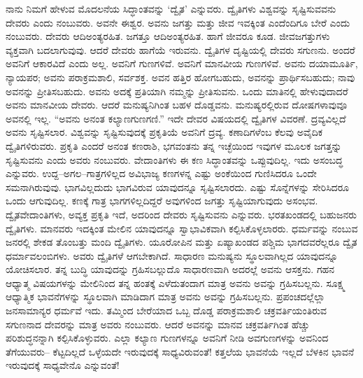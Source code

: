 ನಾನು ನಿಮಗೆ ಹೇಳುವ ಮೊದಲನೆಯ ಸಿದ್ಧಾಂತವನ್ನು ‘ದ್ವೈತ’ ಎನ್ನುವರು. ದ್ವೈತಿಗಳು ವಿಶ್ವವನ್ನು ಸೃಷ್ಟಿಸುವವನು ದೇವರು ಎಂದು ನಂಬುವರು. ಅವನೇ ಈಶ್ವರ. ಅವನು ಜಗತ್ತು ಮತ್ತು ಜೀವ ಇವಕ್ಕಿಂತ ಎಂದೆಂದಿಗೂ ಬೇರೆ ಎಂದು ನಂಬುವರು. ದೇವರು ಆದಿಅಂತ್ಯರಹಿತ. ಜಗತ್ತೂ ಆದಿಅಂತ್ಯರಹಿತ. ಹಾಗೆ ಜೀವರೂ ಕೂಡ. ಜೀವಜಗತ್ತುಗಳು ವ್ಯಕ್ತವಾಗಿ ಬದಲಾಗುವುವು. ಆದರೆ ದೇವರು ಹಾಗೆಯೆ ಇರುವನು. ದ್ವೈತಿಗಳ ದೃಷ್ಟಿಯಲ್ಲಿ ದೇವರು ಸಗುಣನು. ಅಂದರೆ ಅವನಿಗೆ ಆಕಾರವಿದೆ ಎಂದು ಅಲ್ಲ. ಅವನಿಗೆ ಗುಣಗಳಿವೆ. ಅವನಿಗೆ ಮಾನವೀಯ ಗುಣಗಳಿವೆ. ಅವನು ದಯಾಮೂರ್ತಿ, ನ್ಯಾಯಪರ; ಅವನು ಪರಾಕ್ರಮಶಾಲಿ, ಸರ್ವಶಕ್ತ. ಅವನ ಹತ್ತಿರ ಹೋಗಬಹುದು, ಅವನನ್ನು ಪ್ರಾರ್ಥಿಸಬಹುದು; ನಾವು ಅವನನ್ನು ಪ್ರೀತಿಸಬಹುದು. ಅವನು ಅದಕ್ಕೆ ಪ್ರತಿಯಾಗಿ ನಮ್ಮನ್ನು ಪ್ರೀತಿಸುವನು. ಒಂದು ಮಾತಿನಲ್ಲಿ ಹೇಳುವುದಾದರೆ ಅವನು ಮಾನವೀಯ ದೇವರು. ಆದರೆ ಮನುಷ್ಯನಿಗಿಂತ ಬಹಳ ದೊಡ್ಡವನು. ಮನುಷ್ಯರಲ್ಲಿರುವ ದೋಷಗಳಾವುವೂ ಅವನಲ್ಲಿ ಇಲ್ಲ. “ಅವನು ಅನಂತ ಕಲ್ಯಾಣಗುಣಗಣಿ.” ಇದೇ ದೇವರ ವಿಷಯದಲ್ಲಿ ದ್ವೈತಿಗಳ ವಿವರಣೆ. ದ್ರವ್ಯವಿಲ್ಲದೆ ಅವನು ಸೃಷ್ಟಿಸಲಾರ. ವಿಶ್ವವನ್ನು ಸೃಷ್ಟಿಸುವುದಕ್ಕೆ ಪ್ರಕೃತಿಯೆ ಅವನಿಗೆ ದ್ರವ್ಯ. ಕಣಾದಿಗಳೆಂಬ ಕೆಲವು ಅವೈದಿಕ ದ್ವೈತಿಗಳಿರುವರು. ಪ್ರಕೃತಿ ಎಂದರೆ ಅನಂತ ಕಣರಾಶಿ, ಭಗವಂತನು ತನ್ನ ಇಚ್ಛೆಯಿಂದ ಇವುಗಳ ಮೂಲಕ ಜಗತ್ತನ್ನು ಸೃಷ್ಟಿಸುವನು ಎಂದು ಅವರು ನಂಬುವರು. ವೇದಾಂತಿಗಳು ಈ ಕಣ ಸಿದ್ಧಾಂತವನ್ನು ಒಪ್ಪುವುದಿಲ್ಲ. ಇದು ಅಸಂಬದ್ಧ ಎನ್ನುವರು. ಉದ್ದ–ಅಗಲ–ಗಾತ್ರಗಳಿಲ್ಲದ ಅವಿಭಾಜ್ಯ ಕಣಗಳನ್ನ ಎಷ್ಟು ಅಂಕೆಯಿಂದ ಗುಣಿಸಿದರೂ ಒಂದೇ ಸಮನಾಗಿರುವುವು. ಭಾಗವಿಲ್ಲದುದು ಭಾಗವಿರುವ ಯಾವುದನ್ನೂ ಸೃಷ್ಟಿಸಲಾರದು. ಎಷ್ಟು ಸೊನ್ನೆಗಳನ್ನು ಸೇರಿಸಿದರೂ ಒಂದು ಆಗುವುದಿಲ್ಲ. ಕಣಕ್ಕೆ ಗಾತ್ರ ಭಾಗಗಳಿಲ್ಲದಿದ್ದರೆ ಅವುಗಳಿಂದ ಜಗತ್ತು ಸೃಷ್ಟಿಯಾಗುವುದು ಅಸಂಭವ. ದ್ವೈತವೇದಾಂತಿಗಳು, ಅವ್ಯಕ್ತ ಪ್ರಕೃತಿ ಇದೆ, ಅದರಿಂದ ದೇವರು ಸೃಷ್ಟಿಸುವನು ಎನ್ನುವರು. ಭರತಖಂಡದಲ್ಲಿ ಬಹುಜನರು ದ್ವೈತಿಗಳು. ಮಾನವರು ಇದಕ್ಕಿಂತ ಮೇಲಿನ ಯಾವುದನ್ನೂ ಸ್ವಾಭಾವಿಕವಾಗಿ ಕಲ್ಪಿಸಿಕೊಳ್ಳಲಾರರು. ಧರ್ಮವನ್ನು ನಂಬುವ ಜನರಲ್ಲಿ ಶೇಕಡ ತೊಂಬತ್ತು ಮಂದಿ ದ್ವೈತಿಗಳು. ಯೂರೋಪಿನ ಮತ್ತು ಏಷ್ಯಾಖಂಡದ ಪಶ್ಚಿಮ ಭಾಗದವರೆಲ್ಲರೂ ದ್ವೈತ ಧರ್ಮಾವಲಂಬಿಗಳು. ಅವರು ದ್ವೈತಿಗಳೆ ಆಗಬೇಕಾಗಿದೆ. ಸಾಧಾರಣ ಮನುಷ್ಯನು ಸ್ಥೂಲವಾಗಿಲ್ಲದ ಯಾವುದನ್ನೂ ಯೋಚಿಸಲಾರ. ತನ್ನ ಬುದ್ಧಿ ಯಾವುದನ್ನು ಗ್ರಹಿಸಬಲ್ಲುದೊ ಸಾಧಾರಣವಾಗಿ ಅದರಲ್ಲೆ ಅವನು ಆಸಕ್ತನು. ಗಹನ ಆಧ್ಯಾತ್ಮ ವಿಷಯಗಳನ್ನು ಮೇಲಿನಿಂದ ತನ್ನ ಹಂತಕ್ಕೆ ಎಳೆದುತಂದಾಗ ಮಾತ್ರ ಅವನು ಅವನ್ನು ಗ್ರಹಿಸಬಲ್ಲನು. ಸೂಕ್ಷ್ಮ ಆಧ್ಯಾತ್ಮಿಕ ಭಾವನೆಗಳನ್ನು ಸ್ಥೂಲವಾಗಿ ಮಾಡಿದಾಗ ಮಾತ್ರ ಅವನು ಅವನ್ನು ಗ್ರಹಿಸಬಲ್ಲನು. ಪ್ರಪಂಚದಲ್ಲೆಲ್ಲಾ ಜನಸಾಮಾನ್ಯರ ಧರ್ಮವೆ ಇದು. ತಮ್ಮಿಂದ ಬೇರೆಯಾದ ಒಬ್ಬ ದೊಡ್ಡ ಪರಾಕ್ರಮಶಾಲಿ ಚಕ್ರವರ್ತಿಯಂತಿರುವ ಸಗುಣನಾದ ದೇವರನ್ನು ಮಾತ್ರ ಅವರು ನಂಬುವರು. ಆದರೆ ಅವನನ್ನು ಮಾನವ ಚಕ್ರವರ್ತಿಗಿಂತ ಹೆಚ್ಚು ಪರಿಶುದ್ಧನನ್ನಾಗಿ ಕಲ್ಪಿಸಿಕೊಳ್ಳುವರು. ಎಲ್ಲಾ ಕಲ್ಯಾಣ ಗುಣಗಳನ್ನೂ ಅವನಿಗೆ ನೀಡಿ ಅವಗುಣಗಳನ್ನು ಅವನಿಂದ ತೆಗೆಯುವರು– ಕೆಟ್ಟದಿಲ್ಲದೆ ಒಳ್ಳೆಯದೇ ಇರುವುದಕ್ಕೆ ಸಾಧ್ಯವಿರುವಂತೆ! ಕತ್ತಲೆಯ ಭಾವನೆಯೆ ಇಲ್ಲದೆ ಬೆಳಕಿನ ಭಾವನೆ ಇರುವುದಕ್ಕೆ ಸಾಧ್ಯವೇನೊ ಎನ್ನುವಂತೆ!

\vskip 0.2cm

